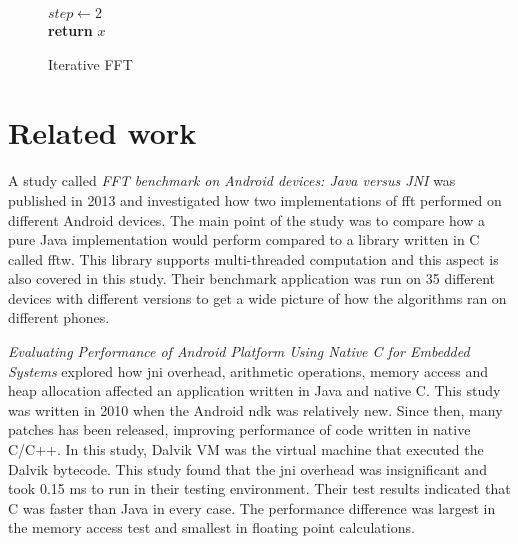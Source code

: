 \ifrelease
\begin{figure}[H]
    \begin{algorithm}[H]


        $step \gets 2$\\
        \textbf{return} $x$
        \caption{Iterative FFT}
        \label{alg:fft}
    \end{algorithm}
\end{figure}
\fi

\section{Related work}
A study called \emph{FFT benchmark on Android devices: Java versus JNI} \cite{Jr2013} was published in 2013 and investigated how two implementations of \gls{fft} performed on different Android devices. The main point of the study was to compare how a pure Java implementation would perform compared to a library written in C called \gls{fftw}. This library supports multi-threaded computation and this aspect is also covered in this study. Their benchmark application was run on 35 different devices with different versions to get a wide picture of how the algorithms ran on different phones.

\emph{Evaluating Performance of Android Platform Using Native C for Embedded Systems} \cite{Lee2010} explored how \gls{jni} overhead, arithmetic operations, memory access and heap allocation affected an application written in Java and native C. This study was written in 2010 when the Android \gls{ndk} was relatively new. Since then, many patches has been released, improving performance of code written in native C/C++. In this study, Dalvik VM was the virtual machine that executed the Dalvik bytecode. This study found that the \gls{jni} overhead was insignificant and took 0.15 ms to run in their testing environment. Their test results indicated that C was faster than Java in every case. The performance difference was largest in the memory access test and smallest in floating point calculations.

